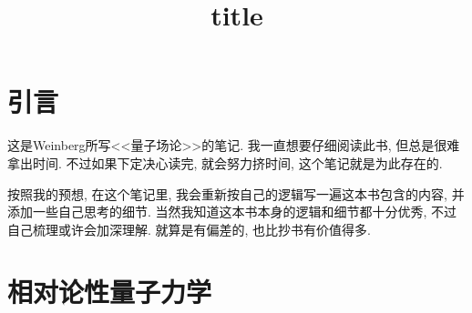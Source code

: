 \documentclass[a4paper,11pt]{article}
\title{title}
\date{ }
\begin{document}
\maketitle
\newpage
\tableofcontents
\newpage

\section{引言}
这是Weinberg所写<<量子场论>>的笔记. 我一直想要仔细阅读此书, 但总是很难拿出时间. 不过如果下定决心读完, 就会努力挤时间, 这个笔记就是为此存在的.\par
按照我的预想, 在这个笔记里, 我会重新按自己的逻辑写一遍这本书包含的内容, 并添加一些自己思考的细节. 当然我知道这本书本身的逻辑和细节都十分优秀, 不过自己梳理或许会加深理解. 
就算是有偏差的, 也比抄书有价值得多.

\section{相对论性量子力学}



\end{document}
